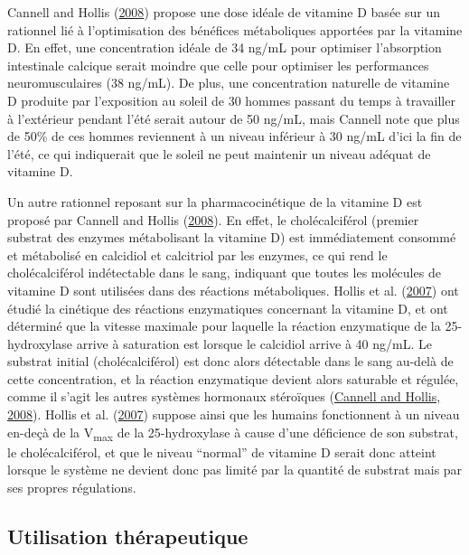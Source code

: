 \documentclass[
  letterpaper,
  DIV=11,
  numbers=noendperiod]{scrartcl}
\begin{document}
Cannell and Hollis (\protect\hyperlink{ref-Cannell.2008}{2008}) propose
une dose idéale de vitamine D basée sur un rationnel lié à
l'optimisation des bénéfices métaboliques apportées par la vitamine D.
En effet, une concentration idéale de 34 ng/mL pour optimiser
l'absorption intestinale calcique serait moindre que celle pour
optimiser les performances neuromusculaires (38 ng/mL). De plus, une
concentration naturelle de vitamine D produite par l'exposition au
soleil de 30 hommes passant du temps à travailler à l'extérieur pendant
l'été serait autour de 50 ng/mL, mais Cannell note que plus de 50\% de
ces hommes reviennent à un niveau inférieur à 30 ng/mL d'ici la fin de
l'été, ce qui indiquerait que le soleil ne peut maintenir un niveau
adéquat de vitamine D.

Un autre rationnel reposant sur la pharmacocinétique de la vitamine D
est proposé par Cannell and Hollis
(\protect\hyperlink{ref-Cannell.2008}{2008}). En effet, le
cholécalciférol (premier substrat des enzymes métabolisant la vitamine
D) est immédiatement consommé et métabolisé en calcidiol et calcitriol
par les enzymes, ce qui rend le cholécalciférol indétectable dans le
sang, indiquant que toutes les molécules de vitamine D sont utilisées
dans des réactions métaboliques. Hollis et al.
(\protect\hyperlink{ref-Hollis.2007}{2007}) ont étudié la cinétique des
réactions enzymatiques concernant la vitamine D, et ont déterminé que la
vitesse maximale pour laquelle la réaction enzymatique de la
25-hydroxylase arrive à saturation est lorsque le calcidiol arrive à 40
ng/mL. Le substrat initial (cholécalciférol) est donc alors détectable
dans le sang au-delà de cette concentration, et la réaction enzymatique
devient alors saturable et régulée, comme il s'agit les autres systèmes
hormonaux stéroïques (\protect\hyperlink{ref-Cannell.2008}{Cannell and
Hollis, 2008}). Hollis et al.
(\protect\hyperlink{ref-Hollis.2007}{2007}) suppose ainsi que les
humains fonctionnent à un niveau en-deçà de la V\textsubscript{max} de
la 25-hydroxylase à cause d'une déficience de son substrat, le
cholécalciférol, et que le niveau ``normal'' de vitamine D serait donc
atteint lorsque le système ne devient donc pas limité par la quantité de
substrat mais par ses propres régulations.

\hypertarget{utilisation-thuxe9rapeutique}{%
\subsection{Utilisation
thérapeutique}\label{utilisation-thuxe9rapeutique}}
\end{document}
